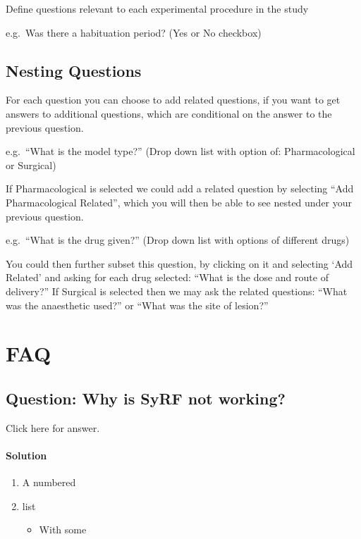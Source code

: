 \documentclass[
]{book}
\providecommand{\tightlist}{%
  \setlength{\itemsep}{0pt}\setlength{\parskip}{0pt}}
\begin{document}
Define questions relevant to each experimental procedure in the study

e.g.~Was there a habituation period?
(Yes or No checkbox)

\hypertarget{nesting-questions}{%
\section{Nesting Questions}\label{nesting-questions}}

For each question you can choose to add related questions, if you want to get answers to additional questions, which are conditional on the answer to the previous question.

e.g.~``What is the model type?''
(Drop down list with option of: Pharmacological or Surgical)

If Pharmacological is selected we could add a related question by selecting ``Add Pharmacological Related'', which you will then be able to see nested under your previous question.

e.g.~``What is the drug given?''
(Drop down list with options of different drugs)

You could then further subset this question, by clicking on it and selecting `Add Related' and asking for each drug selected: ``What is the dose and route of delivery?''
If Surgical is selected then we may ask the related questions: ``What was the anaesthetic used?'' or ``What was the site of lesion?''

\hypertarget{faq}{%
\chapter{FAQ}\label{faq}}

\hypertarget{question-why-is-syrf-not-working}{%
\section{Question: Why is SyRF not working?}\label{question-why-is-syrf-not-working}}

Click here for answer.

\hypertarget{solution}{%
\subsubsection{Solution}\label{solution}}

\begin{enumerate}
\def\labelenumi{\arabic{enumi}.}
\tightlist
\item
  A numbered
\item
  list

  \begin{itemize}
  \tightlist
  \item
    With some
  \end{itemize}
\end{enumerate}
\end{document}
